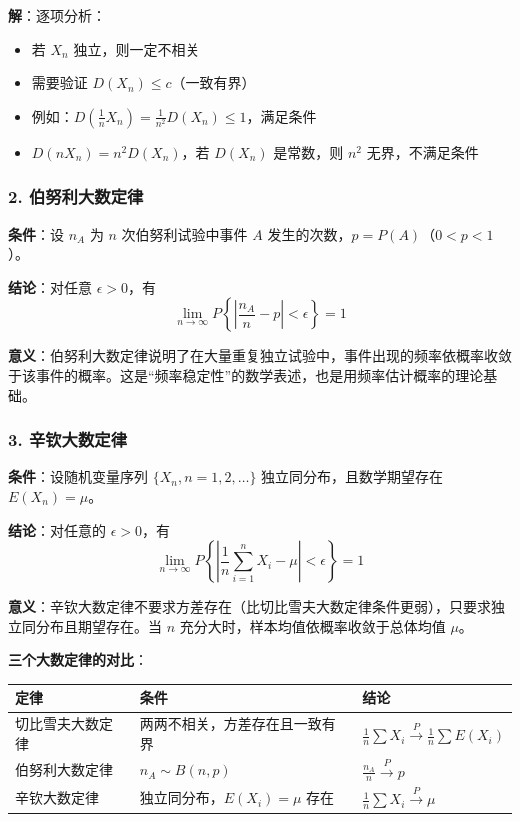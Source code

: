 \documentclass[12pt,a4paper]{ctexart}
\begin{document}
\textbf{解}：逐项分析：
\begin{itemize}[noitemsep]
    \item 若 $X_n$ 独立，则一定不相关
    \item 需要验证 $D(X_n) \le c$（一致有界）
    \item 例如：$D(\frac{1}{n}X_n) = \frac{1}{n^2} D(X_n) \le 1$，满足条件
    \item $D(nX_n) = n^2 D(X_n)$，若 $D(X_n)$ 是常数，则 $n^2$ 无界，不满足条件
\end{itemize}

\subsubsection{2. 伯努利大数定律}
\textbf{条件}：设 $n_A$ 为 $n$ 次伯努利试验中事件 $A$ 发生的次数，$p = P(A)$（$0 < p < 1$）。

\textbf{结论}：对任意 $\epsilon > 0$，有
\[ \lim_{n \to \infty} P\left\{\left|\frac{n_A}{n} - p\right| < \epsilon\right\} = 1 \]

\textbf{意义}：伯努利大数定律说明了在大量重复独立试验中，事件出现的频率依概率收敛于该事件的概率。这是“频率稳定性”的数学表述，也是用频率估计概率的理论基础。

\subsubsection{3. 辛钦大数定律}
\textbf{条件}：设随机变量序列 $\{X_n, n = 1, 2, \dots\}$ 独立同分布，且数学期望存在 $E(X_n) = \mu$。

\textbf{结论}：对任意的 $\epsilon > 0$，有
\[ \lim_{n \to \infty} P\left\{\left|\frac{1}{n} \sum_{i=1}^n X_i - \mu\right| < \epsilon\right\} = 1 \]

\textbf{意义}：辛钦大数定律不要求方差存在（比切比雪夫大数定律条件更弱），只要求独立同分布且期望存在。当 $n$ 充分大时，样本均值依概率收敛于总体均值 $\mu$。

\textbf{三个大数定律的对比}：

\begin{center}
    \begin{tabular}{@{}lll@{}}
        \toprule
        \textbf{定律} & \textbf{条件}             & \textbf{结论}                                                  \\ \midrule
        切比雪夫大数定律    & 两两不相关，方差存在且一致有界         & $\frac{1}{n}\sum X_i \xrightarrow{P} \frac{1}{n}\sum E(X_i)$ \\
        伯努利大数定律     & $n_A \sim B(n, p)$      & $\frac{n_A}{n} \xrightarrow{P} p$                            \\
        辛钦大数定律      & 独立同分布，$E(X_i) = \mu$ 存在 & $\frac{1}{n}\sum X_i \xrightarrow{P} \mu$                    \\ \bottomrule
    \end{tabular}
\end{center}
\end{document}
